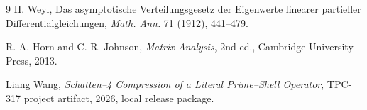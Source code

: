 \documentclass[10pt]{article}
\begin{document}
\begin{thebibliography}{9}
H. Weyl, Das asymptotische Verteilungsgesetz der Eigenwerte linearer partieller
Differentialgleichungen, \emph{Math. Ann.} 71 (1912), 441--479.

R. A. Horn and C. R. Johnson, \emph{Matrix Analysis}, 2nd ed., Cambridge
University Press, 2013.

Liang Wang, \emph{Schatten--4 Compression of a Literal Prime--Shell Operator},
TPC-317 project artifact, 2026, local release package.
\end{thebibliography}
\end{document}
